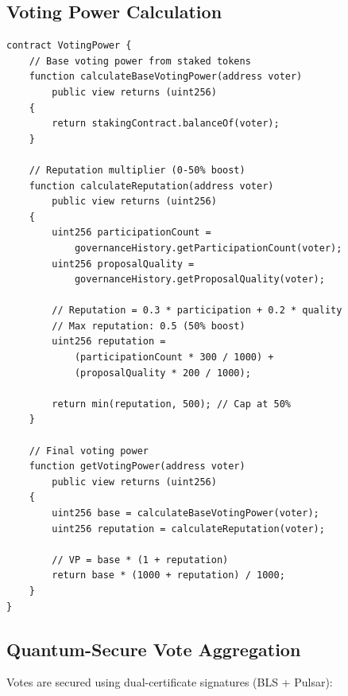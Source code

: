 \subsection{Voting Power Calculation}

\begin{lstlisting}[language=Solidity,caption=Voting power calculation with reputation]
contract VotingPower {
    // Base voting power from staked tokens
    function calculateBaseVotingPower(address voter)
        public view returns (uint256)
    {
        return stakingContract.balanceOf(voter);
    }

    // Reputation multiplier (0-50% boost)
    function calculateReputation(address voter)
        public view returns (uint256)
    {
        uint256 participationCount =
            governanceHistory.getParticipationCount(voter);
        uint256 proposalQuality =
            governanceHistory.getProposalQuality(voter);

        // Reputation = 0.3 * participation + 0.2 * quality
        // Max reputation: 0.5 (50% boost)
        uint256 reputation =
            (participationCount * 300 / 1000) +
            (proposalQuality * 200 / 1000);

        return min(reputation, 500); // Cap at 50%
    }

    // Final voting power
    function getVotingPower(address voter)
        public view returns (uint256)
    {
        uint256 base = calculateBaseVotingPower(voter);
        uint256 reputation = calculateReputation(voter);

        // VP = base * (1 + reputation)
        return base * (1000 + reputation) / 1000;
    }
}
\end{lstlisting}

\subsection{Quantum-Secure Vote Aggregation}

Votes are secured using dual-certificate signatures (BLS + Pulsar):

